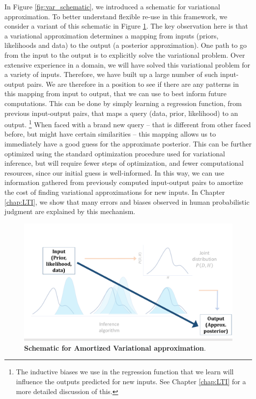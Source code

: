 In Figure \ref{fig:var_schematic}, we introduced a schematic for variational approximation. To better understand flexible re-use in this framework, we consider a variant of this schematic in Figure \ref{fig:var_schematic_amort}. The key observation here is that a variational approximation determines a mapping from inputs (priors, likelihoods and data) to the output (a posterior approximation). One path to go from the input to the output is to explicitly solve the variational problem. Over extensive experience in a domain, we will have solved this variational problem for a variety of inputs. Therefore, we have built up a large number of such input-output pairs. We are therefore in a position to see if there are any patterns in this mapping from input to output, that we can use to best inform future computations. This can be done by simply learning a regression function, from previous input-output pairs, that maps a query (data, prior, likelihood) to an output. \footnote{The inductive biases we use in the regression function that we learn will influence the outputs predicted for new inputs. See Chapter \ref{chap:LTI} for a more detailed discussion of this.} When faced with a brand new query -- that is different from other faced before, but might have certain similarities -- this mapping allows us to immediately have a good guess for the approximate posterior. This can be further optimized using the standard optimization procedure used for variational inference, but will require fewer steps of optimization, and fewer computational resources, since our initial guess is well-informed. In this way, we can use information gathered from previously computed input-output pairs to amortize the cost of finding variational approximations for new inputs. In Chapter \ref{chap:LTI}, we show that many errors and biases observed in human probabilistic judgment are explained by this mechanism.

\begin{figure}[t!]
\centering
\includegraphics[width = \textwidth]{figures/var_schematic_amort.pdf}
\caption{\textbf{Schematic for Amortized Variational approximation}. }
\label{fig:var_schematic_amort}
\end{figure}

